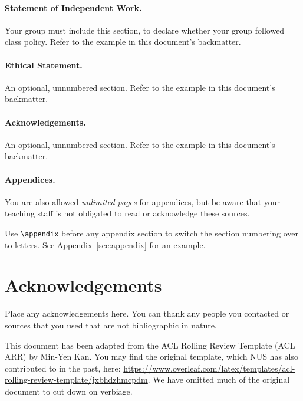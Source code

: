 \documentclass[11pt]{article}
\begin{document}
\paragraph{Statement of Independent Work.} Your group must include this section, to declare whether your group followed class policy.  Refer to the example in this document's backmatter.

\paragraph{Ethical Statement.} An optional, unnumbered section. 
Refer to the example in this document's backmatter.

\paragraph{Acknowledgements.} An optional, unnumbered section. 
Refer to the example in this document's backmatter.

\paragraph{Appendices.} You are also allowed {\it unlimited pages} for appendices, but be aware that your teaching staff is not obligated to read or acknowledge these sources.

Use \verb|\appendix| before any appendix section to switch the section numbering over to letters. See Appendix~\ref{sec:appendix} for an example.


\clearpage




\section*{Acknowledgements}

Place any acknowledgements here.  You can thank any people you contacted or sources that you used that are not bibliographic in nature.

This document has been adapted from the ACL Rolling Review Template (ACL ARR) by Min-Yen Kan.  You may find the original template, which NUS has also contributed to in the past, here: \url{https://www.overleaf.com/latex/templates/acl-rolling-review-template/jxbhdzhmcpdm}.  We have omitted much of the original document to cut down on verbiage.
\end{document}
